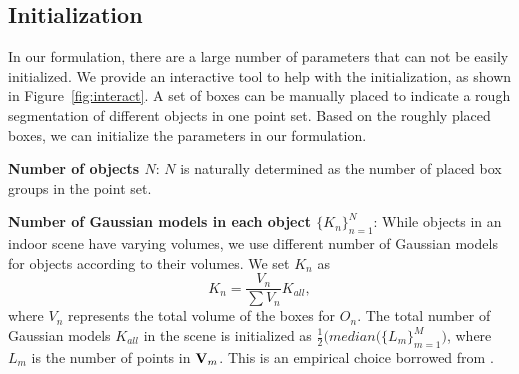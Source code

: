 \subsection{Initialization}
\label{sec:imp:interact}
%
In our formulation, there are a large number of parameters that can not be easily initialized.
%
We provide an interactive tool to help with the initialization, as shown in Figure~\ref{fig:interact}. 
A set of boxes can be manually placed to indicate a rough segmentation of different objects in one point set. 
%
Based on the roughly placed boxes, we can initialize the parameters in our formulation. 

\noindent\textbf{Number of objects $N$}: $N$ is naturally determined as the number of placed box groups in the point set.

\noindent\textbf{Number of Gaussian models in each object $\{K_n\}^N_{n=1}$}: While objects in an indoor scene have varying volumes, we use different number of Gaussian models for objects according to their volumes. We set $K_n$ as 
\begin{equation}
\label{equ:K_n}
K_n=\frac{V_n}{\sum V_n}K_{all},
\end{equation}
%
where $V_n$ represents the total volume of the boxes for $O_n$. 
The total number of Gaussian models $K_{all}$ in the scene is initialized as $\frac{1}{2}\big(median(\{L_m\}^M_{m=1}\big)$, where $L_m$ is the number of points in $\mathbf{V}_m$. 
This is an empirical choice borrowed from \cite{Evangelidis2014}.

